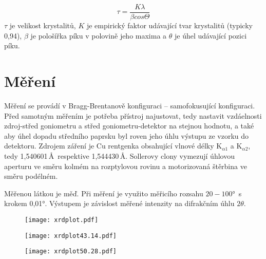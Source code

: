 \documentclass[a4paper,12pt]{article}
\begin{document}
\begin{equation}
	\tau = \dfrac{K\lambda}{\beta cos\Theta}
\end{equation}
$\tau$ je velikost krystalitů, $K$ je empirický faktor udávající tvar 
krystalitů (typicky 0,94), $\beta$ je pološířka píku v polovině jeho maxima a 
$\theta$ je úhel udávající pozici píku.

\section{Měření}
\par Měření se provádí v Bragg-Brentanově konfiguraci -- samofokusující 
konfiguraci. Před samotným měřením je potřeba přístroj najustovat, tedy 
nastavit 
vzdáelnosti zdroj-střed goniometru a střed goniometru-detektor na stejnou 
hodnotu, a také aby úhel dopadu středního paprsku byl roven jeho úhlu výstupu 
ze vzorku do detektoru. Zdrojem záření je Cu rentgenka obsahující vlnové délky 
K$_{\alpha1}$ a K$_{\alpha2}$, tedy 1,540601\,\AA\ respektive 1,544430\,\AA. 
Sollerovy clony vymezují úhlovou aperturu ve směru kolmém na rozptylovou rovinu 
a motorizovaná štěrbina ve směru podélném.
\par Měřenou látkou je měď. Při měření je využito měřicího rozsahu 
$20 - 100$°~s krokem 0,01°. Výstupem je závislost měřené intenzity na 
difrakčním úhlu $2\theta$.

\begin{figure}[h!]
	\centering
	\texttt{[image: xrdplot.pdf]}
	\caption{\centering }
	\label{fig:spectrum}
\end{figure}




\begin{figure}[h!]
	\centering
	\texttt{[image: xrdplot43.14.pdf]}
	\caption{\centering }
	\label{fig:spectrum}
\end{figure}

\begin{figure}[h!]
\centering
\texttt{[image: xrdplot50.28.pdf]}
\caption{\centering }
\label{fig:spectrum}
\end{figure}
\end{document}
